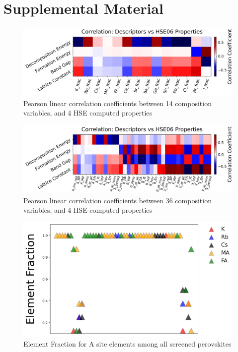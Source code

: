 \documentclass[twoside, twocolumn, 9pt, draft]{article}
\begin{document}


\section*{Supplemental Material}
\label{sec:orgd6aaf75}
\printglossaries

\begin{figure}
\centering
\includegraphics[width=.9\linewidth]{./expval/HSE_v_comp_pearson2.png}
\caption{\label{fig:pearson_hcomp} Pearson linear correlation coefficients between 14 composition variables, and 4 HSE computed properties}
\end{figure}

\begin{figure}
\centering
\includegraphics[width=.9\linewidth]{./expval/HSE_v_site_prop_pearson.png}
\caption{\label{fig:pearson_hsite} Pearson linear correlation coefficients between 36 composition variables, and 4 HSE computed properties}
\end{figure}

\begin{figure}
\centering
\includegraphics[width=.9\linewidth]{./expval/Element_AFrac.jpg}
\caption{\label{fig:sreened_frac_A} Element Fraction for A site elements among all screened perovskites}
\end{figure}
\end{document}
